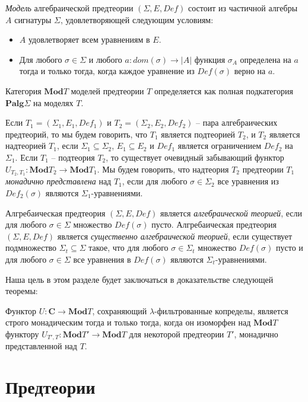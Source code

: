 \documentclass{amsart}
\theoremstyle{definition}
\theoremstyle{remark}
\newcommand{\cat}[1]{\mathbf{#1}}
\renewcommand{\C}{\cat{C}}
\numberwithin{figure}{section}
\begin{document}
\emph{Модель} алгебраической предтеории $(\Sigma, E, Def)$ состоит из частичной алгебры $A$ сигнатуры $\Sigma$, удовлетворяющей следующим условиям:
\begin{itemize}
\item $A$ удовлетворяет всем уравнениям в $E$.
\item Для любого $\sigma \in \Sigma$ и любого $a : dom(\sigma) \to |A|$ функция $\sigma_A$ определена на $a$ тогда и только тогда, когда каждое уравнение из $Def(\sigma)$ верно на $a$.
\end{itemize}
Категория $\cat{Mod}T$ моделей предтеории $T$ определяется как полная подкатегория $\cat{Palg}\Sigma$ на моделях $T$.

Если $T_1 = (\Sigma_1, E_1, Def_1)$ и $T_2 = (\Sigma_2, E_2, Def_2)$ -- пара алгебраических предтеорий, то мы будем говорить, что $T_1$ является подтеорией $T_2$, и $T_2$ является надтеорией $T_1$, если $\Sigma_1 \subseteq \Sigma_2$, $E_1 \subseteq E_2$ и $Def_1$ является ограничением $Def_2$ на $\Sigma_1$.
Если $T_1$ -- подтеория $T_2$, то существует очевидный забывающий функтор $U_{T_2,T_1} : \cat{Mod}T_2 \to \cat{Mod}T_1$.
Мы будем говорить, что надтеория $T_2$ предтеории $T_1$ \emph{монадично представлена} над $T_1$, если для любого $\sigma \in \Sigma_2$ все уравнения из $Def_2(\sigma)$ являются $\Sigma_1$-уравнениями.

Алгребаическая предтеория $(\Sigma, E, Def)$ является \emph{алгебраической теорией}, если для любого $\sigma \in \Sigma$ множество $Def(\sigma)$ пусто.
Алгребаическая предтеория $(\Sigma, E, Def)$ является \emph{существенно алгебраической теорией}, если существует подмножество $\Sigma_t \subseteq \Sigma$ такое, что для любого $\sigma \in \Sigma_t$ множество $Def(\sigma)$ пусто и для любого $\sigma \in \Sigma$ все уравнения в $Def(\sigma)$ являются $\Sigma_t$-уравнениями.

Наша цель в этом разделе будет заключаться в доказательстве следующей теоремы:
\begin{thm}
Функтор $U : \C \to \cat{Mod}T$, сохраняющий $\lambda$-фильтрованные копределы, является строго монадическим тогда и только тогда, когда он изоморфен над $\cat{Mod}T$ функтору $U_{T',T} : \cat{Mod}T' \to \cat{Mod}T$ для некоторой предтеории $T'$, монадично представленной над $T$.
\end{thm}

\section{Предтеории}
\end{document}
